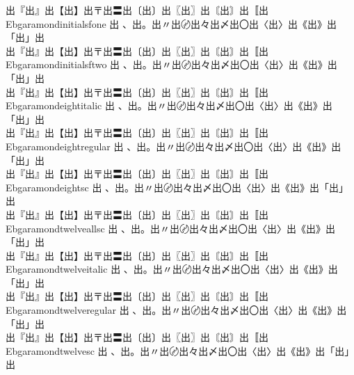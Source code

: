 \begin{tabbing}
\> {\mktsFontfileEbgaramondinitials{}出『出』出【出】出〒出〓出〔出〕出〖出〗出〘出〙出〚出} \\
Ebgaramondinitialsfone \> {\mktsFontfileEbgaramondinitialsfone{}出 、出。出〃出〄出々出〆出〇出〈出〉出《出》出「出」出}\\
\> {\mktsFontfileEbgaramondinitialsfone{}出『出』出【出】出〒出〓出〔出〕出〖出〗出〘出〙出〚出} \\
Ebgaramondinitialsftwo \> {\mktsFontfileEbgaramondinitialsftwo{}出 、出。出〃出〄出々出〆出〇出〈出〉出《出》出「出」出}\\
\> {\mktsFontfileEbgaramondinitialsftwo{}出『出』出【出】出〒出〓出〔出〕出〖出〗出〘出〙出〚出} \\
Ebgaramondeightitalic \> {\mktsFontfileEbgaramondeightitalic{}出 、出。出〃出〄出々出〆出〇出〈出〉出《出》出「出」出}\\
\> {\mktsFontfileEbgaramondeightitalic{}出『出』出【出】出〒出〓出〔出〕出〖出〗出〘出〙出〚出} \\
Ebgaramondeightregular \> {\mktsFontfileEbgaramondeightregular{}出 、出。出〃出〄出々出〆出〇出〈出〉出《出》出「出」出}\\
\> {\mktsFontfileEbgaramondeightregular{}出『出』出【出】出〒出〓出〔出〕出〖出〗出〘出〙出〚出} \\
Ebgaramondeightsc \> {\mktsFontfileEbgaramondeightsc{}出 、出。出〃出〄出々出〆出〇出〈出〉出《出》出「出」出}\\
\> {\mktsFontfileEbgaramondeightsc{}出『出』出【出】出〒出〓出〔出〕出〖出〗出〘出〙出〚出} \\
Ebgaramondtwelveallsc \> {\mktsFontfileEbgaramondtwelveallsc{}出 、出。出〃出〄出々出〆出〇出〈出〉出《出》出「出」出}\\
\> {\mktsFontfileEbgaramondtwelveallsc{}出『出』出【出】出〒出〓出〔出〕出〖出〗出〘出〙出〚出} \\
Ebgaramondtwelveitalic \> {\mktsFontfileEbgaramondtwelveitalic{}出 、出。出〃出〄出々出〆出〇出〈出〉出《出》出「出」出}\\
\> {\mktsFontfileEbgaramondtwelveitalic{}出『出』出【出】出〒出〓出〔出〕出〖出〗出〘出〙出〚出} \\
Ebgaramondtwelveregular \> {\mktsFontfileEbgaramondtwelveregular{}出 、出。出〃出〄出々出〆出〇出〈出〉出《出》出「出」出}\\
\> {\mktsFontfileEbgaramondtwelveregular{}出『出』出【出】出〒出〓出〔出〕出〖出〗出〘出〙出〚出} \\
Ebgaramondtwelvesc \> {\mktsFontfileEbgaramondtwelvesc{}出 、出。出〃出〄出々出〆出〇出〈出〉出《出》出「出」出}\\

\end{tabbing}
